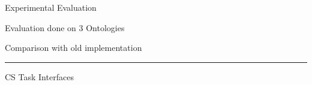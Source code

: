 \documentclass[final,hyperref={pdfpagelabels=true}]{beamer}
\newenvironment{myhline}
 {\par\setlength{\topskip}{0em}%
  \begin{list}{}{%
    \setlength{\leftmargin}{0em}%
    \setlength{\rightmargin}{3em}%
  }\item\relax}
 {\par\nopagebreak\rule{\linewidth}{0.4pt}\end{list}}
\begin{document}
\begin{frame}
\begin{columns}[t, onlytextwidth]
\begin{column}{\textwidth}
		
		\begin{columns}[t, onlytextwidth]
			\begin{column}{.49\linewidth}
				\begin{block}{Experimental Evaluation}
					\begin{minipage}[t][.25\textheight][c]{\textwidth}
						\begin{minipage}[t]{.45\textwidth}
							\small
							{}\par
							Evaluation done on 3 Ontologies\\
						\end{minipage}
						\begin{minipage}[t]{.45\textwidth}
							\small
							{}\par
							Comparison with old implementation\\
						\end{minipage}
						\begin{myhline}
							\vspace{-2cm}
							\hfill
						\end{myhline}
						\vspace{-5mm}
						\begin{minipage}[t]{\textwidth}
							\small
							{CS Task Interfaces}
							

\end{minipage}
\end{minipage}
\end{block}
\end{column}
\end{columns}
\end{column}
\end{columns}
\end{frame}
\end{document}

